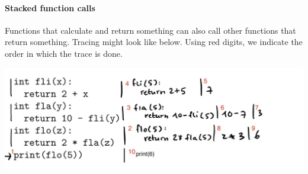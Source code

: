 \paragraph{Stacked function calls} Functions that calculate and return something can also call other functions that return something. Tracing might look like below. Using red digits, we indicate the order in which the trace is done.

\includegraphics[width=.9\textwidth]{7-trace-multi-returns.jpeg}
